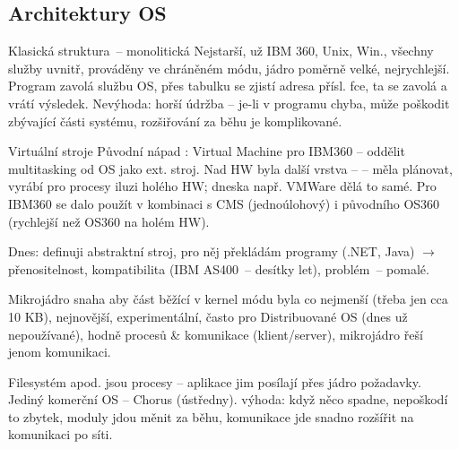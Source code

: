 \subsection{Architektury OS}

\begin{obecne}{Klasická struktura~-- monolitická}
Nejstarší, už IBM 360, Unix, Win., všechny služby uvnitř, prováděny ve chráněném módu, jádro poměrně velké,  nejrychlejší. Program zavolá službu OS, přes tabulku se zjistí adresa přísl. fce, ta se zavolá a vrátí výsledek.  Nevýhoda: horší údržba -- je-li v programu chyba, může poškodit zbývající části systému, rozšiřování za běhu je komplikované. 
\end{obecne}

\begin{obecne}{Virtuální stroje}
Původní nápad : Virtual Machine pro IBM360 -- oddělit multitasking od OS jako ext. stroj. Nad HW byla další vrstva --  -- měla plánovat, vyrábí pro procesy iluzi holého HW; dneska např. VMWare dělá to samé. Pro IBM360 se dalo použít v kombinaci s CMS (jednoúlohový) i původního OS360 (rychlejší než OS360 na holém HW). 

Dnes: definuji abstraktní stroj, pro něj překládám programy (.NET, Java) $\rightarrow$ přenositelnost, kompatibilita (IBM AS400~-- desítky let), problém~-- pomalé. 
\end{obecne}

\begin{obecne}{Mikrojádro}
snaha aby část běžící v kernel módu byla co nejmenší (třeba jen cca 10 KB), nejnovější, experimentální, často pro Distribuované OS (dnes už nepoužívané), hodně procesů \& komunikace (klient/server), mikrojádro řeší jenom komunikaci. 

Filesystém apod. jsou procesy -- aplikace jim posílají přes jádro požadavky. Jediný komerční OS -- Chorus (ústředny). výhoda: když něco spadne, nepoškodí to zbytek, moduly jdou měnit za běhu, komunikace jde snadno rozšířit na komunikaci po síti. 
\end{obecne}

